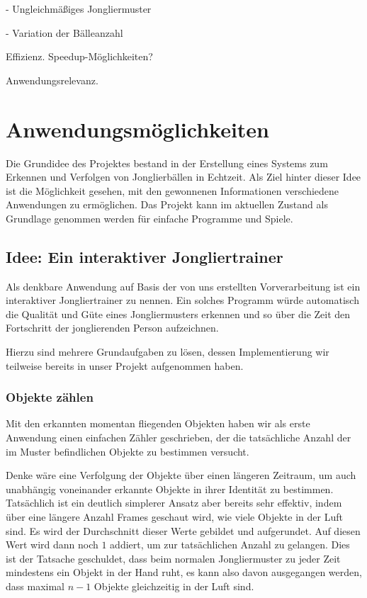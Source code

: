 \documentclass[12pt,a4paper,ngerman]{scrartcl}
\begin{document}
  - Ungleichmäßiges Jongliermuster
  
  - Variation der Bälleanzahl

Effizienz. Speedup-Möglichkeiten?

Anwendungsrelevanz.

\section{Anwendungsmöglichkeiten}

Die Grundidee des Projektes bestand in der Erstellung eines Systems zum Erkennen und 
Verfolgen von Jonglierbällen in Echtzeit. Als Ziel hinter dieser Idee ist die 
Möglichkeit gesehen, mit den gewonnenen Informationen verschiedene Anwendungen zu 
ermöglichen. Das Projekt kann im aktuellen Zustand als Grundlage genommen werden 
für einfache Programme und Spiele.

\subsection{Idee: Ein interaktiver Jongliertrainer}

Als denkbare Anwendung auf Basis der von uns erstellten Vorverarbeitung ist ein
interaktiver Jongliertrainer zu nennen. Ein solches Programm würde automatisch die 
Qualität und Güte eines Jongliermusters erkennen und so über die Zeit den Fortschritt
der jonglierenden Person aufzeichnen.

Hierzu sind mehrere Grundaufgaben zu lösen, dessen Implementierung wir teilweise
bereits in unser Projekt aufgenommen haben.

\subsubsection{Objekte zählen}

Mit den erkannten momentan fliegenden Objekten haben wir als erste Anwendung einen
einfachen Zähler geschrieben, der die tatsächliche Anzahl der im Muster befindlichen Objekte zu bestimmen versucht.

Denke wäre eine Verfolgung der Objekte über einen längeren Zeitraum, um auch 
unabhängig voneinander erkannte Objekte in ihrer Identität zu bestimmen. Tatsächlich
ist ein deutlich simplerer Ansatz aber bereits sehr effektiv, indem über eine 
längere Anzahl Frames geschaut wird, wie viele Objekte in der Luft sind. Es wird der 
Durchschnitt dieser Werte gebildet und aufgerundet. Auf diesen Wert wird dann noch 
$1$ addiert, um zur tatsächlichen Anzahl zu gelangen. Dies ist der Tatsache 
geschuldet, dass beim normalen Jongliermuster zu jeder Zeit mindestens ein Objekt in der Hand ruht, es kann also davon ausgegangen werden, dass maximal $n - 1$ Objekte 
gleichzeitig in der Luft sind.
\end{document}
